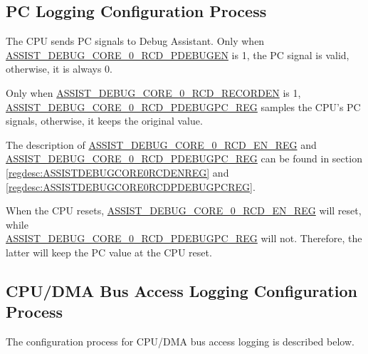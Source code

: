 \documentclass[main\_\_EN.tex]{subfiles}
\begin{document}
\subsection{PC Logging Configuration Process}

The CPU sends PC signals to Debug Assistant. Only when \hyperref[fielddesc:ASSISTDEBUGCORE0RCDPDEBUGEN]{ASSIST\_DEBUG\_CORE\_0\_RCD\_PDEBUGEN} is 1, the PC signal is valid, otherwise, it is always 0. 

Only when \hyperref[fielddesc:ASSISTDEBUGCORE0RCDRECORDEN]{ASSIST\_DEBUG\_CORE\_0\_RCD\_RECORDEN} is 1, \hyperref[regdesc:ASSISTDEBUGCORE0RCDPDEBUGPCREG]{ASSIST\_DEBUG\_CORE\_0\_RCD\_PDEBUGPC\_REG} samples the CPU's PC signals, otherwise, it keeps the original value.

The description of \hyperref[regdesc:ASSISTDEBUGCORE0RCDENREG]{ASSIST\_DEBUG\_CORE\_0\_RCD\_EN\_REG} and \hyperref[regdesc:ASSISTDEBUGCORE0RCDPDEBUGPCREG]{ASSIST\_DEBUG\_CORE\_0\_RCD\_PDEBUGPC\_REG} can be found in section \ref{regdesc:ASSISTDEBUGCORE0RCDENREG} and \ref{regdesc:ASSISTDEBUGCORE0RCDPDEBUGPCREG}.

When the CPU resets, \hyperref[regdesc:ASSISTDEBUGCORE0RCDENREG]{ASSIST\_DEBUG\_CORE\_0\_RCD\_EN\_REG} will reset, while \\ \hyperref[regdesc:ASSISTDEBUGCORE0RCDPDEBUGPCREG]{ASSIST\_DEBUG\_CORE\_0\_RCD\_PDEBUGPC\_REG} will not. Therefore, the latter will keep the PC value at the CPU reset.

\subsection{CPU/DMA Bus Access Logging Configuration Process}

The configuration process for CPU/DMA bus access logging is described below.
\end{document}
